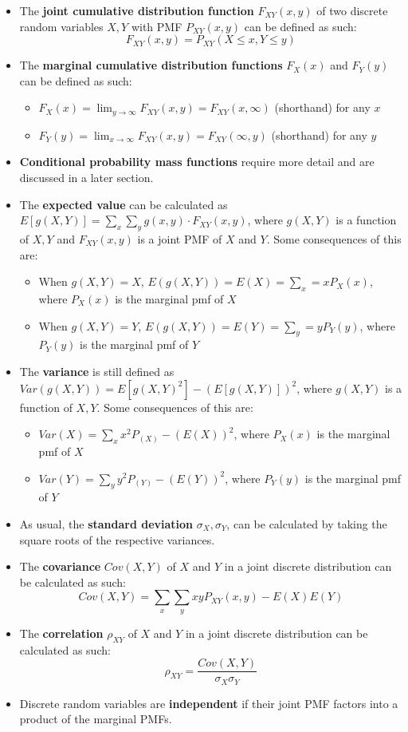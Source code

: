 \documentclass[12pt]{article}
\begin{document}
\begin{itemize}
	\item The \textbf{joint cumulative distribution function} $F_{XY}(x, y)$ of
	      two discrete random variables $X, Y$ with PMF $P_{XY}(x, y)$ can be defined as such:
	      \[
		      F_{XY}(x, y) = P_{XY}(X \leq x, Y \leq y)
	      \]
	\item The \textbf{marginal cumulative distribution functions} $F_X(x)$ and $F_Y(y)$ can be defined as such:
	      \begin{itemize}
		      \item $F_X(x) = \lim_{y\to\infty}F_{XY}(x, y) = F_{XY} (x, \infty)$ (shorthand) for any $x$
		      \item $F_Y(y) = \lim_{x\to\infty}F_{XY}(x, y) = F_{XY} (\infty, y)$ (shorthand) for any $y$
	      \end{itemize}
	\item \textbf{Conditional probability mass functions} require more detail and are discussed in a later section.
	\item The \textbf{expected value} can be calculated as $E[g(X, Y)] = \displaystyle\sum_{x}
		      \displaystyle\sum_{y} g(x, y) \cdot F_{XY}(x, y)$, where $g(X, Y)$ is a
	      function of $X, Y$ and $F_{XY}(x, y)$ is a joint PMF of $X$ and $Y$. Some consequences of this are:
	      \begin{itemize}
		      \item When $g(X, Y) = X$, $E(g(X, Y)) = E(X) = \displaystyle\sum_{x} = x P_X(x)$, where $P_X(x)$ is the marginal pmf of $X$
		      \item When $g(X, Y) = Y$, $E(g(X, Y)) = E(Y) = \displaystyle\sum_{y} = y P_Y(y)$, where $P_Y(y)$ is the marginal pmf of $Y$
	      \end{itemize}
	\item The \textbf{variance} is still defined as $Var(g(X, Y)) = E[g(X,
				      Y)^2] - (E[g(X, Y)])^2$, where $g(X, Y)$ is a function of $X, Y$. Some
	      consequences of this are:
	      \begin{itemize}
		      \item $Var(X) = \displaystyle\sum_{x} x^2 P_(X) - (E(X))^2$, where $P_X(x)$ is the marginal pmf of $X$
		      \item $Var(Y) = \displaystyle\sum_{y} y^2 P_(Y) - (E(Y))^2$, where $P_Y(y)$ is the marginal pmf of $Y$
	      \end{itemize}
	\item As usual, the \textbf{standard deviation} $\sigma_X, \sigma_Y$,
	      can be calculated by taking the square roots of the respective
	      variances.
	\item The \textbf{covariance} $Cov(X, Y)$ of $X$ and $Y$ in a joint discrete distribution can be calculated as such:
	      \[
		      Cov(X, Y) = \displaystyle\sum_{x} \displaystyle\sum_{y} xy P_{XY}(x, y) - E(X)E(Y)
	      \]
	\item The \textbf{correlation} $\rho_{XY}$ of $X$ and $Y$ in a joint discrete distribution can be calculated as such:
	      \[
		      \rho_{XY} = \frac{Cov(X, Y)}{\sigma_X \sigma_Y}
	      \]
	\item Discrete random variables are \textbf{independent} if their joint PMF factors into a product of the marginal PMFs.
\end{itemize}
\end{document}
